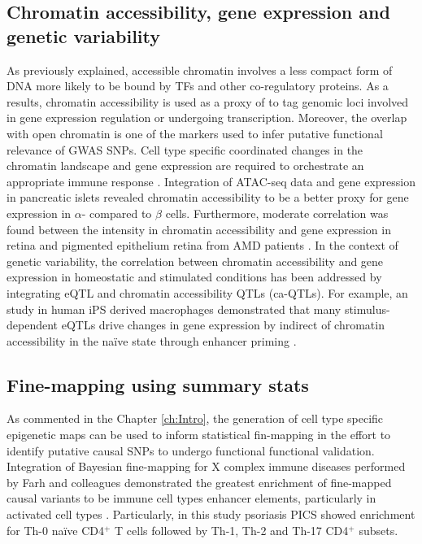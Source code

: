 \subsection{Chromatin accessibility, gene expression and genetic variability}
As previously explained, accessible chromatin involves a less compact form of DNA more likely to be bound by TFs and other co-regulatory proteins. As a results, chromatin accessibility is used as a proxy of to tag genomic loci involved in gene expression regulation or undergoing transcription. Moreover, the overlap with open chromatin is one of the markers used to infer putative functional relevance of GWAS SNPs. Cell type specific coordinated changes in the chromatin landscape and gene expression are required to orchestrate an appropriate immune response \parencite{Goodnow2005}. Integration of ATAC-seq data and gene expression in pancreatic islets revealed chromatin accessibility to be a better proxy for gene expression in $\alpha$- compared to $\beta$ cells. Furthermore, moderate correlation was found between the intensity in chromatin accessibility and gene expression in retina and pigmented epithelium retina from AMD patients \parencite{Wang2018}. In the context of genetic variability, the correlation between chromatin accessibility and gene expression in homeostatic and stimulated conditions  has been addressed by integrating eQTL and chromatin accessibility QTLs (ca-QTLs). For example, an study in human iPS derived macrophages demonstrated that many stimulus-dependent eQTLs drive changes in gene expression by indirect of chromatin accessibility in the na\"{i}ve state through enhancer priming \parencite{Alasoo2018}. 


\subsection{Fine-mapping using summary stats}

As commented in the Chapter \ref{ch:Intro}, the generation of cell type specific epigenetic maps can be used to inform statistical fin-mapping in the effort to identify putative causal SNPs to undergo functional functional validation. Integration of Bayesian fine-mapping for X complex immune diseases performed by Farh and colleagues demonstrated the greatest enrichment of fine-mapped causal variants to be immune cell types enhancer elements, particularly in activated cell types \parencite{Farh2015}. Particularly, in this study psoriasis PICS showed enrichment for Th-0 na\"{i}ve CD4$^+$ T cells followed by Th-1, Th-2 and Th-17 CD4$^+$ subsets.

